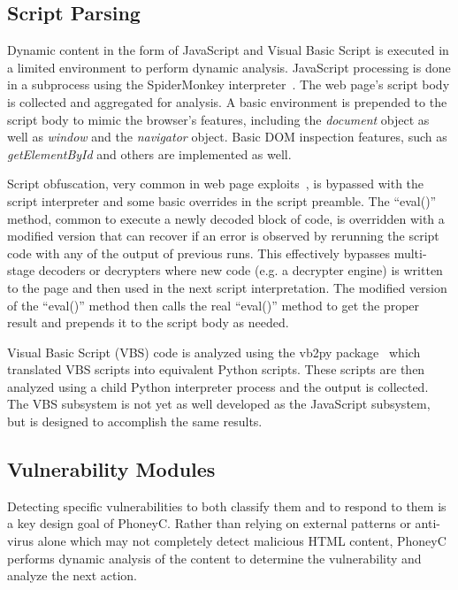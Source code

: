 \documentclass[10pt,twocolumn]{article}
\begin{document}
\subsection{Script Parsing}
\label{script-parsing}

Dynamic content in the form of JavaScript and Visual Basic Script is executed in a limited environment to perform dynamic analysis. JavaScript processing is done in a subprocess using the SpiderMonkey interpreter~\cite{foundation:sjc}. The web page's script body is collected and aggregated for analysis. A basic environment is prepended to the script body to mimic the browser's features, including the {\em document} object as well as {\em window} and the {\em navigator} object. Basic DOM inspection features, such as {\em getElementById} and others are implemented as well. 

Script obfuscation, very common in web page exploits~\cite{provos:ayi}, is bypassed with the script interpreter and some basic overrides in the script preamble. The ``eval()'' method, common to execute a newly decoded block of code, is overridden with a modified version that can recover if an error is observed by rerunning the script code with any of the output of previous runs. This effectively bypasses multi-stage decoders or decrypters where new code (e.g. a decrypter engine) is written to the page and then used in the next script interpretation. The modified version of  the ``eval()'' method then calls the real ``eval()'' method to get the proper result and prepends it to the script body as needed.

Visual Basic Script (VBS) code is analyzed using the vb2py package~\cite{vb2py} which translated VBS scripts into equivalent Python scripts. These scripts are then analyzed using a child Python interpreter process and the output is collected. The VBS subsystem is not yet as well developed as the JavaScript subsystem, but is designed to accomplish the same results.

\subsection{Vulnerability Modules}
\label{vuln-modules}

Detecting specific vulnerabilities to both classify them and to respond to them is a key design goal of PhoneyC. Rather than relying on external patterns or anti-virus alone which may not completely detect malicious HTML content, PhoneyC performs dynamic analysis of the content to determine the vulnerability and analyze the next action.
\end{document}
